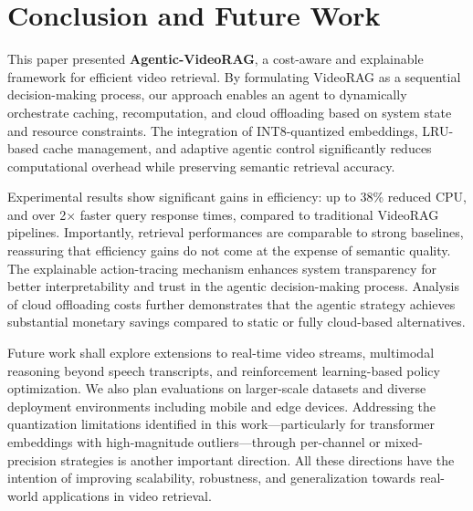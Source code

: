 \documentclass[conference,twocolumn]{IEEEtran}
\begin{document}
\section{Conclusion and Future Work}
This paper presented \textbf{Agentic-VideoRAG}, a cost-aware and explainable framework for efficient video retrieval. By formulating VideoRAG as a sequential decision-making process, our approach enables an agent to dynamically orchestrate caching, recomputation, and cloud offloading based on system state and resource constraints. The integration of INT8-quantized embeddings, LRU-based cache management, and adaptive agentic control significantly reduces computational overhead while preserving semantic retrieval accuracy.

Experimental results show significant gains in efficiency: up to 38\% reduced CPU, and over 2$\times$ faster query response times, compared to traditional VideoRAG pipelines. Importantly, retrieval performances are comparable to strong baselines, reassuring that efficiency gains do not come at the expense of semantic quality. The explainable action-tracing mechanism enhances system transparency for better interpretability and trust in the agentic decision-making process. Analysis of cloud offloading costs further demonstrates that the agentic strategy achieves substantial monetary savings compared to static or fully cloud-based alternatives.

Future work shall explore extensions to real-time video streams, multimodal reasoning beyond speech transcripts, and reinforcement learning-based policy optimization. We also plan evaluations on larger-scale datasets and diverse deployment environments including mobile and edge devices. Addressing the quantization limitations identified in this work---particularly for transformer embeddings with high-magnitude outliers---through per-channel or mixed-precision strategies is another important direction. All these directions have the intention of improving scalability, robustness, and generalization towards real-world applications in video retrieval.
\end{document}
